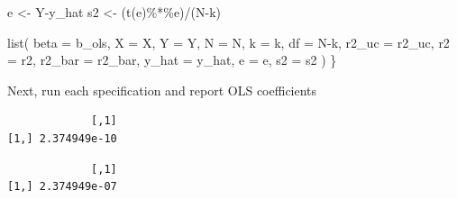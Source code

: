 \documentclass[
  letterpaper,
  DIV=11,
  numbers=noendperiod]{scrartcl}
\newenvironment{Shaded}{\begin{snugshade}}{\end{snugshade}}
\newcommand{\AttributeTok}[1]{\textcolor[rgb]{0.40,0.45,0.13}{#1}}
\newcommand{\CommentTok}[1]{\textcolor[rgb]{0.37,0.37,0.37}{#1}}
\newcommand{\DecValTok}[1]{\textcolor[rgb]{0.68,0.00,0.00}{#1}}
\newcommand{\FunctionTok}[1]{\textcolor[rgb]{0.28,0.35,0.67}{#1}}
\newcommand{\NormalTok}[1]{\textcolor[rgb]{0.00,0.23,0.31}{#1}}
\newcommand{\OtherTok}[1]{\textcolor[rgb]{0.00,0.23,0.31}{#1}}
\newcommand{\SpecialCharTok}[1]{\textcolor[rgb]{0.37,0.37,0.37}{#1}}
\begin{document}
\begin{Shaded}
\begin{Highlighting}[]
\NormalTok{  e }\OtherTok{\textless{}{-}}\NormalTok{ Y}\SpecialCharTok{{-}}\NormalTok{y\_hat}
\NormalTok{  s2 }\OtherTok{\textless{}{-}}\NormalTok{ (}\FunctionTok{t}\NormalTok{(e)}\SpecialCharTok{\%*\%}\NormalTok{e)}\SpecialCharTok{/}\NormalTok{(N}\SpecialCharTok{{-}}\NormalTok{k)}

  \FunctionTok{list}\NormalTok{(}
    \AttributeTok{beta =}\NormalTok{ b\_ols,}
    \AttributeTok{X =}\NormalTok{ X,}
    \AttributeTok{Y =}\NormalTok{ Y,}
    \AttributeTok{N =}\NormalTok{ N,}
    \AttributeTok{k =}\NormalTok{ k,}
    \AttributeTok{df =}\NormalTok{ N}\SpecialCharTok{{-}}\NormalTok{k,}
    \AttributeTok{r2\_uc =}\NormalTok{ r2\_uc,}
    \AttributeTok{r2 =}\NormalTok{ r2,}
    \AttributeTok{r2\_bar =}\NormalTok{ r2\_bar,}
    \AttributeTok{y\_hat =}\NormalTok{ y\_hat,}
    \AttributeTok{e =}\NormalTok{ e,}
    \AttributeTok{s2 =}\NormalTok{ s2}
\NormalTok{  )}
\NormalTok{\}}
\end{Highlighting}
\end{Shaded}

Next, run each specification and report OLS coefficients

\begin{Shaded}
\end{Shaded}

\begin{verbatim}
             [,1]
[1,] 2.374949e-10
\end{verbatim}

\begin{Shaded}
\end{Shaded}

\begin{verbatim}
             [,1]
[1,] 2.374949e-07
\end{verbatim}
\end{document}
